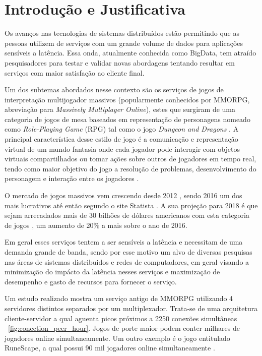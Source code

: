 \section{Introdução e Justificativa}
\label{sec:int}

Os avanços nas tecnologias de sistemas distribuídos estão permitindo que as pessoas utilizem de serviços com um grande volume de dados para aplicações sensíveis a latência. Essa onda, atualmente conhecida como BigData, tem atraído pesquisadores para testar e validar novas abordagens tentando resultar em serviços com maior satisfação ao cliente final\cite{mmo_analytic}.

Um dos subtemas abordados nesse contexto são os serviços de jogos de interpretação multijogador massivos (popularmente conhecidos por MMORPG, abreviação para \textit{Massively Multiplayer Online}), estes que surgiram de uma categoria de jogos de mesa baseados em representação de personagens nomeado como \textit{Role-Playing Game} (RPG) tal como o jogo \textit{Dungeon and Dragons} \cite{tsr1980dungeons}. A principal característica desse estilo de jogo é a comunicação e representação virtual de um mundo fantasia onde cada jogador pode interagir com objetos virtuais compartilhados ou tomar ações sobre outros de jogadores em tempo real, tendo como maior objetivo do jogo a resolução de problemas, desenvolvimento do personagem e interação entre os jogadores \cite{video_game_technologies}.

O mercado de jogos massivos vem crescendo desde 2012 \cite{new_york_times}, sendo 2016 um dos mais lucrativos até então segundo o site Statista \cite{statista_2016}. A sua projeção para 2018 é que sejam arrecadados mais de 30 bilhões de dólares americanos com esta categoria de jogos \cite{statista_2018}, um aumento de 20\% a mais sobre o ano de 2016.

Em geral esses serviços tentem a ser sensíveis a latência e necessitam de uma demanda grande de banda, sendo por esse motivo um alvo de diversas pesquisas nas áreas de sistemas distribuidos e redes de computadores, em geral visando a minimização do impácto da latência nesses serviços\cite{stephenclarkewillson2017} e maximização de desempenho e gasto de recursos para fornecer o serviço.

Um estudo realizado \cite{system_performance} mostra um serviço antigo de MMORPG utilizando 4 servidores distintos separados por um multiplexador. Trata-se de uma arquitetura cliente-servidor a qual aguenta picos próximos a 2250 conexões simultâneas ~\ref{fig:conection_peer_hour}. Jogos de porte maior podem conter milhares de jogadores online simultaneamente. Um outro exemplo é o jogo entitulado RuneScape, a qual possui 90 mil jogadores online simultaneamente \cite{runescape_online_users}.

